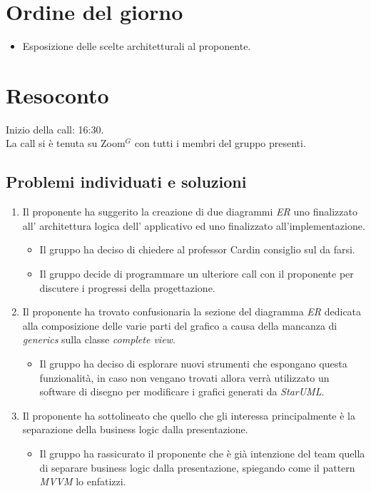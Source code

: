\section{Ordine del giorno}

\begin{itemize}
	\item Esposizione delle scelte architetturali al proponente.
\end{itemize}

\section{Resoconto}
\label{sec:Resoconto}

\noindent
Inizio della call: 16:30. \\
\noindent La call si è tenuta su Zoom$^{G}$ con tutti i membri del gruppo presenti.

\subsection{Problemi individuati e soluzioni}
\begin{enumerate}
	\item Il proponente ha suggerito la creazione di due diagrammi \textit{ER} uno finalizzato all' architettura logica dell' applicativo ed uno finalizzato all'implementazione.
		  \begin{itemize}
			  \item Il gruppo ha deciso di chiedere al professor Cardin consiglio sul da farsi.
			  \item Il gruppo decide di programmare un ulteriore call con il proponente per discutere i progressi della progettazione.
		  \end{itemize}
	\item Il proponente ha trovato confusionaria la sezione del diagramma \textit{ER} dedicata alla composizione delle varie parti del grafico a causa della mancanza di \textit{generics} sulla classe \textit{complete view}.
		  \begin{itemize}
			  \item Il gruppo ha deciso di esplorare nuovi strumenti che espongano questa funzionalità, in caso non vengano trovati allora verrà utilizzato un software di disegno per modificare i grafici generati da \textit{StarUML}.
		  \end{itemize}
	\item Il proponente ha sottolineato che quello che gli interessa principalmente è la separazione della business logic dalla presentazione.
		  \begin{itemize}
			  \item Il gruppo ha rassicurato il proponente che è già intenzione del team quella di separare business logic dalla presentazione, spiegando come il pattern \textit{MVVM} lo enfatizzi.
		  \end{itemize}
\end{enumerate}

